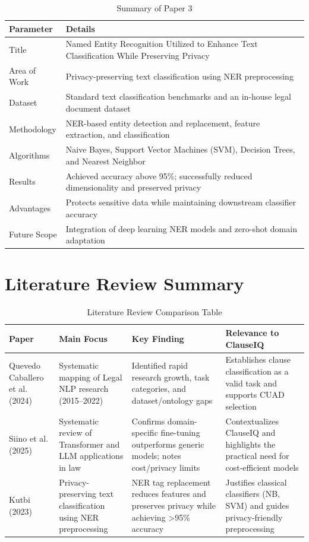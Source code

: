 \documentclass[12pt, a4paper]{report}
\begin{document}
\begin{table}[h]
\centering
\small
\begin{tabular}{p{3.5cm}p{11.5cm}}
\toprule
Parameter & Details \\
\hline
Title & Named Entity Recognition Utilized to Enhance Text Classification While Preserving Privacy \\
Area of Work & Privacy-preserving text classification using NER preprocessing \\
Dataset & Standard text classification benchmarks and an in-house legal document dataset \\
Methodology & NER-based entity detection and replacement, feature extraction, and classification \\
Algorithms & Naive Bayes, Support Vector Machines (SVM), Decision Trees, and Nearest Neighbor \\
Results & Achieved accuracy above 95\%; successfully reduced dimensionality and preserved privacy \\
Advantages & Protects sensitive data while maintaining downstream classifier accuracy \\
Future Scope & Integration of deep learning NER models and zero-shot domain adaptation \\
\bottomrule
\end{tabular}
\caption{Summary of Paper 3}
\label{tab:paper3_summary}
\end{table}

\newpage

\section{Literature Review Summary}
\label{sec:lit_review_summary}

\begin{table}[h]
\centering
\small
\begin{tabular}{p{3.0cm}p{4.2cm}p{4.2cm}p{3.8cm}}
\toprule
Paper & Main Focus & Key Finding & Relevance to ClauseIQ \\
\hline
Quevedo Caballero et al. (2024) & Systematic mapping of Legal NLP research (2015--2022) & Identified rapid research growth, task categories, and dataset/ontology gaps & Establishes clause classification as a valid task and supports CUAD selection \\
\hline
Siino et al. (2025) & Systematic review of Transformer and LLM applications in law & Confirms domain-specific fine-tuning outperforms generic models; notes cost/privacy limits & Contextualizes ClauseIQ and highlights the practical need for cost-efficient models \\
\hline
Kutbi (2023) & Privacy-preserving text classification using NER preprocessing & NER tag replacement reduces features and preserves privacy while achieving >95\% accuracy & Justifies classical classifiers (NB, SVM) and guides privacy-friendly preprocessing \\
\bottomrule
\end{tabular}
\caption{Literature Review Comparison Table}
\label{tab:literature_summary}
\end{table}
\end{document}
